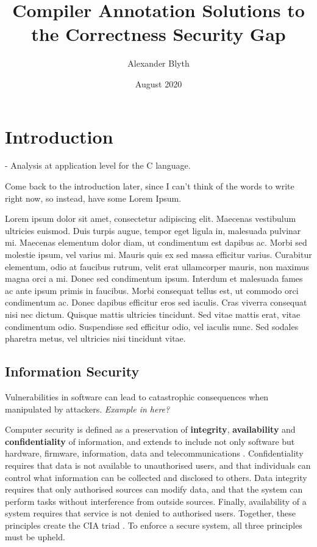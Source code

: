 \documentclass[twocolumn]{article}
\title{Compiler Annotation Solutions to the Correctness Security Gap}
\author{Alexander Blyth}
\date{August 2020}
\begin{document}
    \maketitle

    \section{Introduction}
    - Analysis at application level for the C language. 
    
    Come back to the introduction later, since I can't think of the words to write right now, so instead, have some Lorem Ipsum.

    Lorem ipsum dolor sit amet, consectetur adipiscing elit. Maecenas vestibulum ultricies euismod. Duis turpis augue, tempor eget ligula in, malesuada pulvinar mi. Maecenas elementum dolor diam, ut condimentum est dapibus ac. Morbi sed molestie ipsum, vel varius mi. Mauris quis ex sed massa efficitur varius. Curabitur elementum, odio at faucibus rutrum, velit erat ullamcorper mauris, non maximus magna orci a mi. Donec sed condimentum ipsum. Interdum et malesuada fames ac ante ipsum primis in faucibus. Morbi consequat tellus est, ut commodo orci condimentum ac. Donec dapibus efficitur eros sed iaculis. Cras viverra consequat nisi nec dictum. Quisque mattis ultricies tincidunt. Sed vitae mattis erat, vitae condimentum odio. Suspendisse sed efficitur odio, vel iaculis nunc. Sed sodales pharetra metus, vel ultricies nisi tincidunt vitae.

    \subsection{Information Security}
    Vulnerabilities in software can lead to catastrophic consequences when manipulated by attackers. \textit{Example in here?}

    Computer security is defined as a preservation of \textbf{integrity}, \textbf{availability} and \textbf{confidentiality} of information, and extends to include not only software but hardware, firmware, information, data and telecommunications \cite{guttman1995introduction}.
    Confidentiality requires that data is not available to unauthorised users, and that individuals can control what information can be collected and disclosed to others. Data integrity requires that only authorised sources can modify data, and that the system can perform tasks without interference from outside sources. Finally, availability of a system requires that service is not denied to authorised users. Together, these principles create the CIA triad \cite{stallings2012computer}. To enforce a secure system, all three principles must be upheld.
\end{document}

